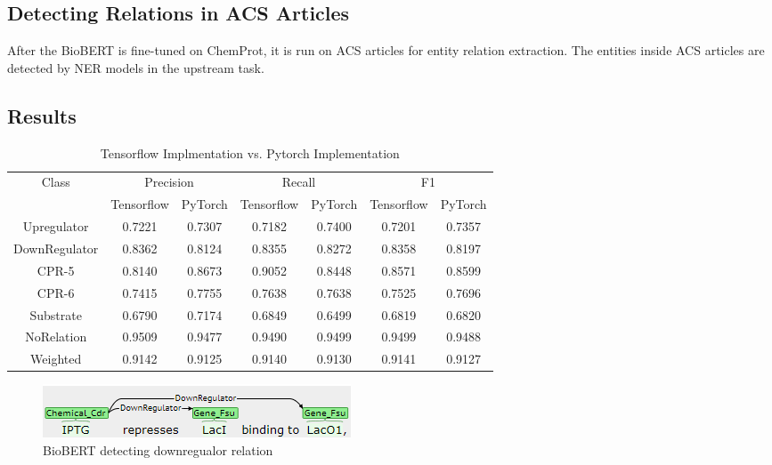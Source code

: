 \documentclass{article}
\begin{document}
\subsection{Detecting Relations in ACS Articles}

After the BioBERT is fine-tuned on ChemProt, it is run on ACS articles for entity relation extraction. The entities
inside ACS articles are detected by NER models in the upstream task.

\subsection{Results}

\begin{table}[ht]
\centering
\caption{Tensorflow Implmentation vs. Pytorch Implementation}
\label{tab:score-cmp}
\begin{tabular}{| c | c c | c c | c c |}
\toprule
Class & \multicolumn{2}{c}{Precision} & \multicolumn{2}{|c|}{Recall} & \multicolumn{2}{c|}{F1} \\
& Tensorflow & PyTorch & Tensorflow & PyTorch & Tensorflow & PyTorch \\
\midrule
Upregulator     & 0.7221    & 0.7307    & 0.7182    & 0.7400    & 0.7201    & 0.7357 \\
DownRegulator   & 0.8362    & 0.8124    & 0.8355    & 0.8272    & 0.8358    & 0.8197 \\
CPR-5           & 0.8140    & 0.8673    & 0.9052    & 0.8448    & 0.8571    & 0.8599 \\
CPR-6           & 0.7415    & 0.7755    & 0.7638    & 0.7638    & 0.7525    & 0.7696 \\
Substrate       & 0.6790    & 0.7174    & 0.6849    & 0.6499    & 0.6819    & 0.6820 \\
NoRelation      & 0.9509    & 0.9477    & 0.9490    & 0.9499    & 0.9499    & 0.9488 \\
\midrule
Weighted        & 0.9142    & 0.9125    & 0.9140    & 0.9130    & 0.9141    & 0.9127 \\
\bottomrule
\end{tabular}
\end{table}

\begin{figure}[ht]
\centering
\includegraphics{brat1}
\caption{BioBERT detecting downregualor relation}
\label{fig:brat1}
\end{figure}
\end{document}
